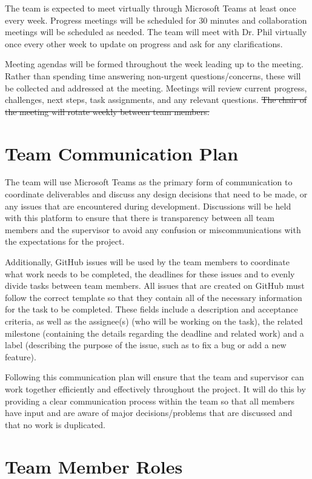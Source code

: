 \documentclass{article}
\begin{document}
The team is expected to meet virtually through Microsoft Teams at least once every week. Progress meetings will be scheduled for 30 minutes and collaboration meetings will be scheduled as needed. The team will meet with Dr. Phil virtually once every other week to update on progress and ask for any clarifications. 

Meeting agendas will be formed throughout the week leading up to the meeting. Rather than spending time answering non-urgent questions/concerns, these will be collected and addressed at the meeting. Meetings will review current progress, challenges, next steps, task assignments, and any relevant questions. \sout{The chair of the meeting will rotate weekly between team members.}

\section{Team Communication Plan}

The team will use Microsoft Teams as the primary form of communication to coordinate deliverables and discuss any design decisions that need to be made, or any issues that are encountered during development. Discussions will be held with this platform to ensure that there is transparency between all team members and the supervisor to avoid any confusion or miscommunications with the expectations for the project. 

Additionally, GitHub issues will be used by the team members to coordinate what work needs to be completed, the deadlines for these issues and to evenly divide tasks between team members. All issues that are created on GitHub must follow the correct template so that they contain all of the necessary information for the task to be completed. These fields include a description and acceptance criteria, as well as the assignee(s) (who will be working on the task), the related milestone (containing the details regarding the deadline and related work) and a label (describing the purpose of the issue, such as to fix a bug or add a new feature).

Following this communication plan will ensure that the team and supervisor can work together efficiently and effectively throughout the project. It will do this by providing a clear communication process within the team so that all members have input and are aware of major decisions/problems that are discussed and that no work is duplicated.


\section{Team Member Roles}
\end{document}
